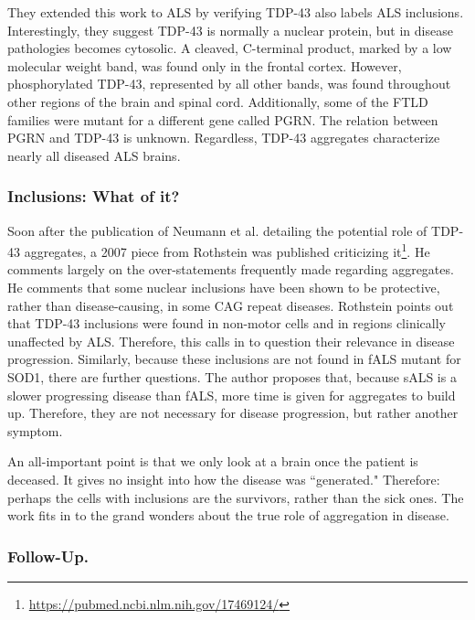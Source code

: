 They extended this work to ALS by verifying TDP-43 also labels ALS inclusions. Interestingly, they suggest TDP-43 is normally a nuclear protein, but in disease pathologies becomes cytosolic. A cleaved, C-terminal product, marked by a low molecular weight band, was found only in the frontal cortex. However, phosphorylated TDP-43, represented by all other bands, was found throughout other regions of the brain and spinal cord. Additionally, some of the FTLD families were mutant for a different gene called PGRN. The relation between PGRN and TDP-43 is unknown. Regardless, TDP-43 aggregates characterize nearly all diseased ALS brains. 


\subsubsection*{Inclusions: What of it?}

Soon after the publication of Neumann et al. detailing the potential role of TDP-43 aggregates, a 2007 piece from Rothstein was published criticizing it\footnote{\url{https://pubmed.ncbi.nlm.nih.gov/17469124/}}. He comments largely on the over-statements frequently made regarding aggregates. He comments that some nuclear inclusions have been shown to be protective, rather than disease-causing, in some CAG repeat diseases. Rothstein points out that TDP-43 inclusions were found in non-motor cells and in regions clinically unaffected by ALS. Therefore, this calls in to question their relevance in disease progression. Similarly, because these inclusions are not found in fALS mutant for SOD1, there are further questions. The author proposes that, because sALS is a slower progressing disease than fALS, more time is given for aggregates to build up. Therefore, they are not necessary for disease progression, but rather another symptom.\newline

An all-important point is that we only look at a brain once the patient is deceased. It gives no insight into how the disease was ``generated." Therefore: perhaps the cells with inclusions are the survivors, rather than the sick ones. The work fits in to the grand wonders about the true role of aggregation in disease. 

\subsubsection*{Follow-Up.}

